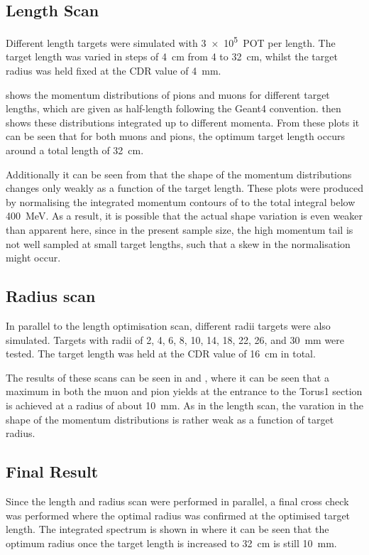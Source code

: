 \FigOptimProdTgtLength
\subsection{Length Scan}
Different length targets were simulated with \num{3e5}~\ac{POT} per length.
The target length was varied in steps of 4~cm from 4 to 32~cm, whilst the target radius was held fixed at the CDR value of 4~mm.

 shows the momentum distributions of pions and muons for different target lengths, which are 
given as half-length following the Geant4 convention.  
 then shows these distributions integrated up to different momenta.
From these plots it can be seen that for both muons and pions, the optimum target length occurs around a total length of 32~cm.

Additionally it can be seen from
 that the shape of the
momentum distributions changes only weakly as a function of the target length.
These plots were produced by normalising the integrated momentum contours of
 to the total integral below
400~MeV.  As a result, it is possible that the actual shape variation is even
weaker than apparent here, since in the present sample size, the high momentum
tail is not well sampled at small target lengths, such that a skew in the
normalisation might occur.

\FigOptimProdTgtRad
\FigOptimProdTgtFinal
\subsection{Radius scan}
In parallel to the length optimisation scan, different radii targets were also simulated.
Targets with radii of 2, 4, 6, 8, 10, 14, 18, 22, 26, and 30~mm were tested.
The target length was held at the \ac{CDR} value of 16~cm in total.

The results of these scans can be seen in  and ,
where it can be seen that a maximum in both the muon and pion yields at the entrance to the Torus1 section is achieved at a radius of about 10~mm.
As in the length scan, the varation in the shape of the momentum distributions is rather weak as a function of target radius.

\subsection{Final Result}
\FigOptimProdTgtComparePhases
Since the length and radius scan were performed in parallel, a final cross check was performed where the optimal radius was confirmed at the optimised target length.
The integrated spectrum is shown in  where it can be seen that the optimum radius once the target length is increased to 32~cm is still 10~mm.

